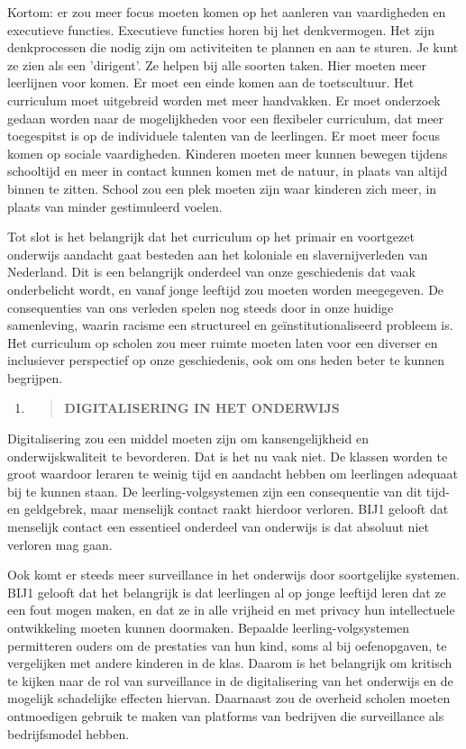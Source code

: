 Kortom: er zou meer focus moeten komen op het aanleren van vaardigheden
en executieve functies. Executieve functies horen bij het denkvermogen.
Het zijn denkprocessen die nodig zijn om activiteiten te plannen en aan
te sturen. Je kunt ze zien als een 'dirigent'. Ze helpen bij alle
soorten taken. Hier moeten meer leerlijnen voor komen. Er moet een einde
komen aan de toetscultuur. Het curriculum moet uitgebreid worden met
meer handvakken. Er moet onderzoek gedaan worden naar de mogelijkheden
voor een flexibeler curriculum, dat meer toegespitst is op de
individuele talenten van de leerlingen. Er moet meer focus komen op
sociale vaardigheden. Kinderen moeten meer kunnen bewegen tijdens
schooltijd en meer in contact kunnen komen met de natuur, in plaats van
altijd binnen te zitten. School zou een plek moeten zijn waar kinderen
zich meer, in plaats van minder gestimuleerd voelen.

Tot slot is het belangrijk dat het curriculum op het primair en
voortgezet onderwijs aandacht gaat besteden aan het koloniale en
slavernijverleden van Nederland. Dit is een belangrijk onderdeel van
onze geschiedenis dat vaak onderbelicht wordt, en vanaf jonge leeftijd
zou moeten worden meegegeven. De consequenties van ons verleden spelen
nog steeds door in onze huidige samenleving, waarin racisme een
structureel en geïnstitutionaliseerd probleem is. Het curriculum op
scholen zou meer ruimte moeten laten voor een diverser en inclusiever
perspectief op onze geschiedenis, ook om ons heden beter te kunnen
begrijpen.

\begin{enumerate}
\def\labelenumi{\arabic{enumi}.}
\setcounter{enumi}{7}
\item
  \begin{quote}
  \textbf{DIGITALISERING IN HET ONDERWIJS}
  \end{quote}
\end{enumerate}

Digitalisering zou een middel moeten zijn om kansengelijkheid en
onderwijskwaliteit te bevorderen. Dat is het nu vaak niet. De klassen
worden te groot waardoor leraren te weinig tijd en aandacht hebben om
leerlingen adequaat bij te kunnen staan. De leerling-volgsystemen zijn
een consequentie van dit tijd- en geldgebrek, maar menselijk contact
raakt hierdoor verloren. BIJ1 gelooft dat menselijk contact een
essentieel onderdeel van onderwijs is dat absoluut niet verloren mag
gaan.

Ook komt er steeds meer surveillance in het onderwijs door soortgelijke
systemen. BIJ1 gelooft dat het belangrijk is dat leerlingen al op jonge
leeftijd leren dat ze een fout mogen maken, en dat ze in alle vrijheid
en met privacy hun intellectuele ontwikkeling moeten kunnen doormaken.
Bepaalde leerling-volgsystemen permitteren ouders om de prestaties van
hun kind, soms al bij oefenopgaven, te vergelijken met andere kinderen
in de klas. Daarom is het belangrijk om kritisch te kijken naar de rol
van surveillance in de digitalisering van het onderwijs en de mogelijk
schadelijke effecten hiervan. Daarnaast zou de overheid scholen moeten
ontmoedigen gebruik te maken van platforms van bedrijven die
surveillance als bedrijfsmodel hebben.

